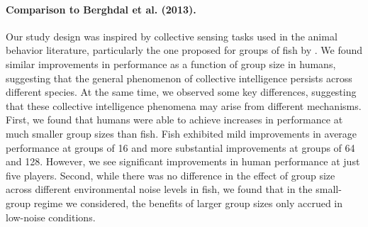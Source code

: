 \documentclass[12pt,letterpaper]{article}
\begin{document}
\paragraph{Comparison to Berghdal et al. (2013).}

Our study design was inspired by collective sensing tasks used in the animal behavior literature, particularly the one proposed for groups of fish by . 
We found similar improvements in performance as a function of group size in humans, suggesting that the general phenomenon of collective intelligence persists across different species.
At the same time, we observed some key differences, suggesting that these collective intelligence phenomena may arise from different mechanisms.
First, we found that humans were able to achieve increases in performance at much smaller group sizes than fish. 
Fish exhibited mild improvements in average performance at groups of 16 and more substantial improvements at groups of 64 and 128.  
However, we see significant improvements in human performance at just five players. 
Second, while there was no difference in the effect of group size across different environmental noise levels in fish, we found that in the small-group regime we considered, the benefits of larger group sizes only accrued in low-noise conditions.

\end{document}
